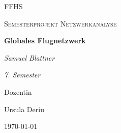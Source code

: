\documentclass[11pt]{article}
\begin{document}
    \begin{titlepage}
        \centering

        {\scshape\LARGE FFHS \par}
        \vspace{1cm}
        {\scshape\Large Semesterprojekt Netzwerkanalyse \par}
        \vspace{1.5cm}
        {\huge\bfseries Globales Flugnetzwerk \par}
        \vspace{2cm}
        {\Large\itshape Samuel Blattner\par}

        {\itshape 7. Semester\par}
        \vfill
        Dozentin\par
        Ursula Deriu

        \vfill

        {\large \today\par}
    \end{titlepage}

    \pagebreak
    \setcounter{tocdepth}{2}
    \tableofcontents

    
    
    


    
    
\end{document}
